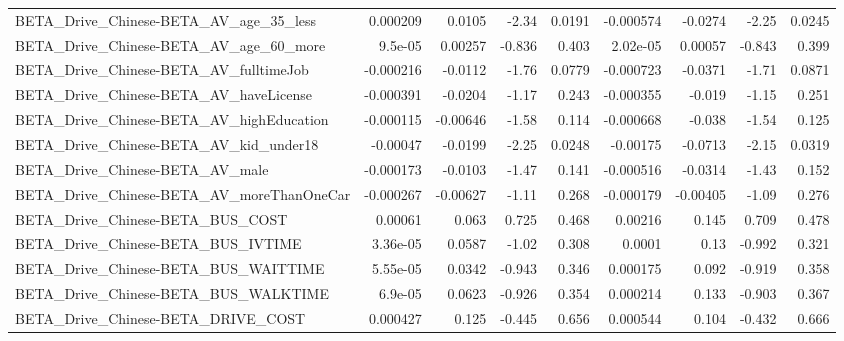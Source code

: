 \begin{tabular}{lrrrrrrrr}
BETA\_Drive\_Chinese-BETA\_AV\_age\_35\_less             &    0.000209 &       0.0105 &    -2.34 &   0.0191 &  -0.000574 &     -0.0274 &        -2.25 &        0.0245 \\
BETA\_Drive\_Chinese-BETA\_AV\_age\_60\_more             &     9.5e-05 &      0.00257 &   -0.836 &    0.403 &   2.02e-05 &     0.00057 &       -0.843 &         0.399 \\
BETA\_Drive\_Chinese-BETA\_AV\_fulltimeJob             &   -0.000216 &      -0.0112 &    -1.76 &   0.0779 &  -0.000723 &     -0.0371 &        -1.71 &        0.0871 \\
BETA\_Drive\_Chinese-BETA\_AV\_haveLicense             &   -0.000391 &      -0.0204 &    -1.17 &    0.243 &  -0.000355 &      -0.019 &        -1.15 &         0.251 \\
BETA\_Drive\_Chinese-BETA\_AV\_highEducation           &   -0.000115 &     -0.00646 &    -1.58 &    0.114 &  -0.000668 &      -0.038 &        -1.54 &         0.125 \\
BETA\_Drive\_Chinese-BETA\_AV\_kid\_under18             &    -0.00047 &      -0.0199 &    -2.25 &   0.0248 &   -0.00175 &     -0.0713 &        -2.15 &        0.0319 \\
BETA\_Drive\_Chinese-BETA\_AV\_male                    &   -0.000173 &      -0.0103 &    -1.47 &    0.141 &  -0.000516 &     -0.0314 &        -1.43 &         0.152 \\
BETA\_Drive\_Chinese-BETA\_AV\_moreThanOneCar          &   -0.000267 &     -0.00627 &    -1.11 &    0.268 &  -0.000179 &    -0.00405 &        -1.09 &         0.276 \\
BETA\_Drive\_Chinese-BETA\_BUS\_COST                   &     0.00061 &        0.063 &    0.725 &    0.468 &    0.00216 &       0.145 &        0.709 &         0.478 \\
BETA\_Drive\_Chinese-BETA\_BUS\_IVTIME                 &    3.36e-05 &       0.0587 &    -1.02 &    0.308 &     0.0001 &        0.13 &       -0.992 &         0.321 \\
BETA\_Drive\_Chinese-BETA\_BUS\_WAITTIME               &    5.55e-05 &       0.0342 &   -0.943 &    0.346 &   0.000175 &       0.092 &       -0.919 &         0.358 \\
BETA\_Drive\_Chinese-BETA\_BUS\_WALKTIME               &     6.9e-05 &       0.0623 &   -0.926 &    0.354 &   0.000214 &       0.133 &       -0.903 &         0.367 \\
BETA\_Drive\_Chinese-BETA\_DRIVE\_COST                 &    0.000427 &        0.125 &   -0.445 &    0.656 &   0.000544 &       0.104 &       -0.432 &         0.666 \\

\end{tabular}
